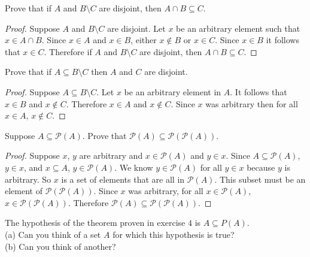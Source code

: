 \begin{tcolorbox}[title=Problem 2, breakable]
    Prove that if $A$ and $B \setminus C$ are disjoint, then $A \cap B \subseteq
        C$.
\end{tcolorbox}

\begin{proof}
    Suppose $A$ and $B \setminus C$ are disjoint. Let $x$ be an arbitrary element such
    that $x \in A \cap B$. Since $x \in A$ and $x \in B$, either $x \not \in B$
    or $x \in C$. Since $x \in B$ it follows that $x \in C$.
    Therefore if $A$ and $B \setminus C$ are disjoint, then $A \cap B \subseteq
        C$.
\end{proof}

\begin{tcolorbox}[title=Problem 3, breakable]
    Prove that if $A \subseteq B \setminus C$ then $A$ and $C$ are disjoint.
\end{tcolorbox}

\begin{proof}
    Suppose $A \subseteq B \setminus C$. Let $x$ be an arbitrary element in $A$.
    It follows that $x \in B$ and $x \not \in C$. Therefore $x \in A$ and $x \not \in C$.
    Since $x$ was arbitrary then for all $x \in A$, $x \not \in C$.
\end{proof}

\begin{tcolorbox}[title=Problem 4, breakable]
    Suppose $A \subseteq  \mathcal{P}(A)$. Prove that $\mathcal{P}(A) \subseteq  \mathcal{P}(\mathcal{P}(A))$.
\end{tcolorbox}

\begin{proof}
    Suppose $x$, $y$ are arbitrary and $x \in \mathcal{P}(A)$ and $y \in x$. 
    Since $A \subseteq \mathcal{P}(A)$, 
    $y \in x$, and $x \subseteq A$,
    $y \in \mathcal{P}(A)$. We know $y \in \mathcal{P}(A)$ for all $y \in x$
    because $y$ is arbitrary. So $x$ is a set of elements that are all in $\mathcal{P}(A)$.
    This subset must be an element of $\mathcal{P}(\mathcal{P}(A))$.
    Since $x$ was arbitrary, for all $x \in \mathcal{P}(A)$,  
    $x \in \mathcal{P}(\mathcal{P}(A))$. Therefore
    $\mathcal{P}(A) \subseteq \mathcal{P}(\mathcal{P}(A))$.
\end{proof}

\begin{tcolorbox}[title=Problem 5, breakable]
    The hypothesis of the theorem proven in exercise $4$
    is $A \subseteq  P(A)$. \\ 
    (a) Can you think of a set $A$ for which this hypothesis is
    true? \\
    (b) Can you think of another?
\end{tcolorbox}

